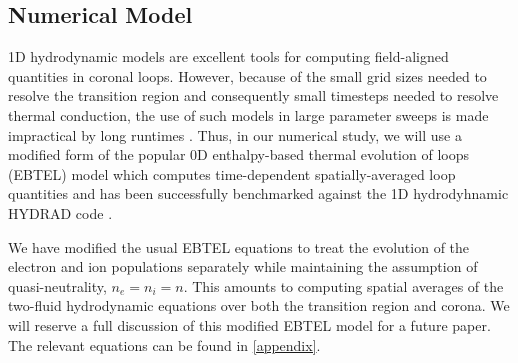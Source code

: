 \documentclass[tighten,apj]{emulateapj}
\begin{document}
	\subsection{Numerical Model}
	\label{subsec:numerics}
	\par 1D hydrodynamic models are excellent tools for computing field-aligned quantities in coronal loops. However, because of the small grid sizes needed to resolve the transition region and consequently small timesteps needed to resolve thermal conduction, the use of such models in large parameter sweeps is made impractical by long runtimes \citep{bradshaw_influence_2013}. Thus, in our numerical study, we will use a modified form of the popular 0D enthalpy-based thermal evolution of loops (EBTEL) model \citep{klimchuk_highly_2008,cargill_enthalpy-based_2012,cargill_enthalpy-based_2012-1,cargill_modelling_2015} which computes time-dependent spatially-averaged loop quantities and has been successfully benchmarked against the 1D hydrodyhnamic HYDRAD code \citep{bradshaw_influence_2013}.
	\par We have modified the usual EBTEL equations \citep[see][]{cargill_enthalpy-based_2012} to treat the evolution of the electron and ion populations separately while maintaining the assumption of quasi-neutrality, $n_e=n_i=n$. This amounts to computing spatial averages of the two-fluid hydrodynamic equations over both the transition region and corona. We will reserve a full discussion of this modified EBTEL model for a future paper. The relevant equations can be found in \autoref{appendix}.  
\end{document}
